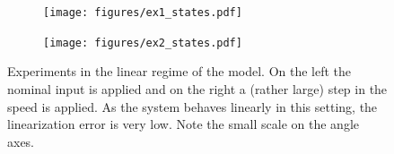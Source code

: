 \begin{figure}[h]
	\centering
	\begin{subfigure}{0.49\textwidth}
	\texttt{[image: figures/ex1\_states.pdf]}
	\end{subfigure}
	\begin{subfigure}{0.49\textwidth}
	\texttt{[image: figures/ex2\_states.pdf]}
	\end{subfigure}
	\caption{Experiments in the linear regime of the model. On the left the nominal input is applied and on the right a (rather large) step in the speed is applied. As the system behaves linearly in this setting, the linearization error is very low. Note the small scale on the angle axes.}
	\label{fig:ex1_ex2}
\end{figure}
